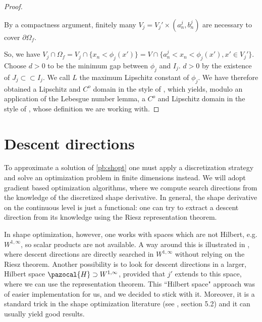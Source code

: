 \documentclass[english,a4paper,9pt,oneside]{scrbook}	%
\theoremstyle{break}
\newenvironment{mproof}[1][\proofname]{%
  \begin{proof}[#1]$ $\par\nobreak\ignorespaces
}{%
  \end{proof}
}
\renewcommand*{\proofname}{Proof}
\theoremstyle{remark}
\newcommand{\cc}{\subset\subset}
\begin{document}
\begin{mproof}

 By a compactness argument, finitely many $V_j = V_j'\times (a_n^j, b_n^j) $ are necessary to cover $\partial \Omega_f$. 

So, we have $V_j \cap \Omega_f = V_j\cap \{x_n<\phi_j(x')\} = V\cap \{a_n^j<x_n<\phi_j(x'), x' \in V_j'\}$. Choose $d>0$ to be the minimum gap between $\phi_j$ and $I_j$. $d>0$ by the existence of $J_j \cc I_j$. We call $L$ the maximum Lipschitz constant of $\phi_j$. 
We have therefore obtained a Lipschitz and $C^o$ domain in the style of \cite{burenkov}, which yields, modulo an application of the Lebesgue number lemma, a $C^o$ and Lipschitz domain in the style of \cite{grisvard}, whose definition we are working with.
\end{mproof}

\section{Descent directions}
\label{sec:hilbert}

To approximate a solution of \cref{pb:shopt} one must apply a discretization strategy and solve an optimization problem in finite dimensions instead. We will adopt gradient based optimization algorithms, where we compute search directions from the knowledge of the discretized shape derivative. In general, the shape derivative on the continuous level is just a functional: one can try to extract a descent direction from its knowledge using the Riesz representation theorem.


In shape optimization, however, one works with spaces which are not Hilbert, e.g. $W^{1,\infty}$, so scalar products are not available. A way around this is illustrated in \cite{deckelnick}, where descent directions are directly searched in $W^{1,\infty}$ without relying on the Riesz theorem. Another possibility is to look for descent directions in a larger, Hilbert space $\pazocal{H}\supset W^{1,\infty}$, provided that $j'$ extends to this space, where we can use the representation theorem. This ``Hilbert space" approach was of easier implementation for us, and we decided to stick with it.  Moreover, it is a standard trick in the shape optimization literature (see \cite{allaire}, section 5.2) and it can usually yield good results.
\end{document}

